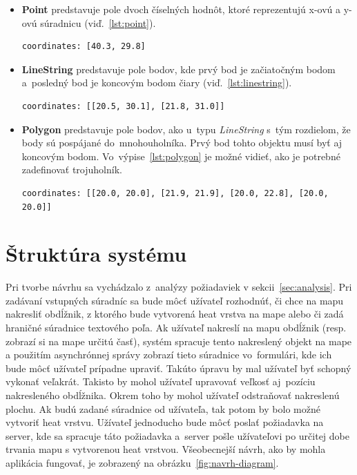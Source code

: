 \begin{itemize}
\item \textbf{Point} predstavuje pole dvoch číselných hodnôt, ktoré reprezentujú x-ovú a y-ovú súradnicu (viď.~\ref{lst:point}).

\begin{lstlisting}
coordinates: [40.3, 29.8]
\end{lstlisting}

\item \textbf{LineString} predstavuje pole bodov, kde prvý bod je začiatočným bodom a~posledný bod je koncovým bodom čiary (viď.~\ref{lst:linestring}).

\begin{lstlisting}
coordinates: [[20.5, 30.1], [21.8, 31.0]]
\end{lstlisting}

\item \textbf{Polygon} predstavuje pole bodov, ako u~typu \emph{LineString} s~tým rozdielom, že body sú pospájané do~mnohouholníka. Prvý bod tohto objektu musí byť aj koncovým bodom. Vo~výpise~\ref{lst:polygon} je možné vidieť, ako je potrebné zadefinovať trojuholník.

\begin{lstlisting}
coordinates: [[20.0, 20.0], [21.9, 21.9], [20.0, 22.8], [20.0, 20.0]]
\end{lstlisting}
\end{itemize}


\section{Štruktúra systému}
Pri tvorbe návrhu sa vychádzalo z~analýzy požiadaviek v sekcii~\ref{sec:analysis}. Pri zadávaní vstupných súradníc sa bude môcť užívateľ rozhodnúť, či chce na mapu nakresliť obdĺžnik, z ktorého bude vytvorená heat vrstva na mape alebo či zadá hraničné súradnice textového poľa. Ak užívateľ nakreslí na mapu obdĺžnik (resp. zobrazí si na mape určitú časť), systém spracuje tento nakreslený objekt na mape a použitím asynchrónnej správy zobrazí tieto súradnice vo~formulári, kde ich bude môcť užívateľ prípadne upraviť. Takúto úpravu by mal užívateľ byť schopný vykonať veľakrát. Takisto by mohol užívateľ upravovať veľkosť aj~pozíciu nakresleného obdĺžnika. Okrem toho by mohol užívateľ odstraňovať nakreslenú plochu. Ak budú zadané súradnice od užívateľa, tak potom by bolo možné vytvoriť heat vrstvu. Užívateľ jednoducho bude môcť poslať požiadavka na server, kde sa spracuje táto požiadavka a~server pošle užívateľovi po určitej dobe trvania mapu s vytvorenou heat vrstvou. Všeobecnejší návrh, ako by mohla aplikácia fungovať, je zobrazený na obrázku~\ref{fig:navrh-diagram}.

